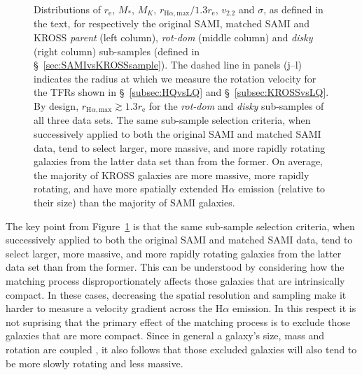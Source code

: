 \documentclass[a4paper,fleqn,usenatbib]{mnras}
\begin{document}
{\begin{figure}
{Distributions of $r_{\text{e}}$, $M_{*}$, $M_{K}$, $r_{\text{H}\alpha,\text{max}}/1.3r_{\text{e}}$, $v_{2.2}$ and $\sigma$, as defined in the text, for respectively the original SAMI, matched SAMI and KROSS \textit{parent} (left column), \textit{rot-dom} (middle column) and \textit{disky} (right column) sub-samples (defined in \S~\ref{sec:SAMIvsKROSSsample}). The dashed line in panels (j--l) indicates the radius at which we measure the rotation velocity for the TFRs shown in \S~\ref{subsec:HQvsLQ} and \S~\ref{subsec:KROSSvsLQ}. By design, $r_{\text{H}\alpha,\text{max}} \gtrsim 1.3r_{\text{e}}$ for the \textit{rot-dom} and \textit{disky} sub-samples of all three data sets. The same sub-sample selection criteria, when successively applied to both the original SAMI and matched SAMI data, tend to select larger, more massive, and more rapidly rotating galaxies from the latter data set than from the former. On average, the majority of KROSS galaxies are more massive, more rapidly rotating, and have more spatially extended H$\alpha$ emission (relative to their size) than the majority of SAMI galaxies. %
     }%
\label{fig:SAMIvsKROSShists}
\end{figure}


The key point from Figure~\ref{fig:SAMIvsKROSShists} is that the same sub-sample selection criteria, when successively applied to both the original SAMI and matched SAMI data, tend to select larger, more massive, and more rapidly rotating galaxies from the latter data set than from the former. This can be understood by considering how the matching process disproportionately affects those galaxies that are intrinsically compact. In these cases, decreasing the spatial resolution and sampling make it harder to measure a velocity gradient across the H$\alpha$ emission. In this respect it is not suprising that the primary effect of the matching process is to exclude those galaxies that are more compact. Since in general a galaxy's size, mass and rotation are coupled \citep[e.g.][]{Ferguson:1994,Shen:2003,Trujillo:2004,Bernardi:2011}, it also follows that those excluded galaxies will also tend to be more slowly rotating and less massive. 

}
\end{document}
